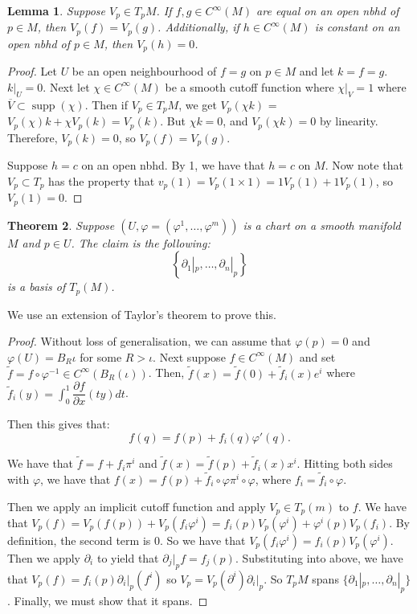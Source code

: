 \documentclass{article}
\newtheorem{theorem}{Theorem}
\newtheorem{lemma}[theorem]{Lemma}
\theoremstyle{definition}
\numberwithin{theorem}{section}
\numberwithin{equation}{section}
\DeclareMathOperator{\supp}{supp}
\begin{document}
\begin{lemma}
	Suppose $V_p \in T_p M$. If $f, g \in C^{\infty}(M)$ are equal on an open nbhd of $p \in M$, then $V_p(f) = V_p(g)$. Additionally, if $h \in C^\infty(M)$ is constant on an open nbhd of $p \in M$, then $V_p (h) = 0$. 
\end{lemma}

\begin{proof}
	Let $U$ be an open neighbourhood of $f = g$ on $p \in M$ and let $k = f = g$. $k|_{U} = 0$. Next let $\chi \in C^\infty(M)$ be a smooth cutoff function where $\chi|_V = 1$ where $\overline{V} \subset \supp(\chi)$.
	Then if $V_p \in T_p M$, we get $V_p(\chi k)$ = $V_p (\chi) k + \chi V_p(k) = V_p(k)$. But $\chi k = 0$, and $V_p (\chi k) = 0$ by linearity. Therefore, $V_p(k) = 0$, so $V_p(f) = V_p(g)$. 

	Suppose $h = c$ on an open nbhd. By 1, we have that $h = c$ on $M$. Now note that $V_p \subset T_p$ has the property that $v_p(1) = V_p(1 \times 1) = 1 V_p(1) + 1 V_p(1)$, so $V_p(1) = 0$.
\end{proof}

\begin{theorem}
	Suppose $(U, \varphi = (\varphi^1, \ldots, \varphi^m))$ is a chart on a smooth manifold $M$ and $p \in U$. The claim is the following:
	\begin{equation}
		\left\{
			\partial_1|_p, \ldots, \partial_n|_p
		\right\}
	\end{equation}
	is a basis of $T_p(M)$. 
\end{theorem}

We use an extension of Taylor's theorem to prove this. 

\begin{proof}
	Without loss of generalisation, we can assume that $\varphi(p) = 0$ and $\varphi(U) = B_R{\iota}$ for some $R > \iota$. Next suppose $f \in C^\infty(M)$ and set $\tilde{f} = f \circ \varphi^{-1} \in C^\infty(B_R(\iota))$. Then, $\tilde{f}(x) = \tilde{f}(0) + \tilde{f}_i (x) e^i$ where $\tilde{f}_i (y) = \int_0^1 \dfrac{\partial f}{\partial x} (ty) dt$. 

	Then this gives that:
	\begin{equation}
		f(q) = f(p) + f_i(q) \varphi'(q).
	\end{equation}

	We have that $\tilde{f} = f + f_i \pi^i$ and $\tilde{f}(x) = \tilde{f}(p) + \tilde{f}_i(x) x^i$. Hitting both sides with $\varphi$, we have that $f(x) = f(p) + \tilde{f}_i \circ \varphi \pi^i \circ \varphi$, where $f_i = \tilde{f}_i \circ \varphi$. 
	
	Then we apply an implicit cutoff function and apply $V_p \in T_p(m)$ to $f$. We have that $V_p(f) = V_p(f(p)) + V_p(f_i \varphi^i) = f_i(p) V_p(\varphi^i) + \varphi^i(p) V_p(f_i)$. By definition, the second term is 0. So we have that $V_p(f_i \varphi^i) = f_i(p) V_p(\varphi^i)$. Then we apply $\partial_i$ to yield that $\partial_j|_p f = f_j(p)$. Substituting into above, we have that $V_p(f) = f_i(p) \partial_i |_p(f^i)$ so $V_p = V_p(\partial^i) \partial_i|_p$. So $T_p M$ spans $\{\partial_1|_p, \ldots, \partial_n|_p \}$. Finally, we must show that it spans. 
\end{proof}
\end{document}
